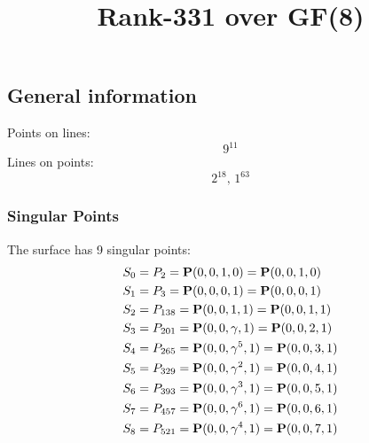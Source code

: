 \documentclass{article}
\newcommand\setTBstruts{\def\T{\rule{0pt}{2.6ex}}%
\def\B{\rule[-1.2ex]{0pt}{0pt}}}
\newcommand{\bP}{{\bf P}}
\begin{document}
 
\setTBstruts



{\allowdisplaybreaks%






\title{Rank-331 over GF(8)}
\author{}%
\maketitle%
%
{}



\subsection*{General information}
Points on lines:
$$
9^{11}$$
Lines on points:
$$
2^{18},\,1^{63}$$
\subsubsection*{Singular Points}
The surface has 9 singular points:\\
\begin{align*}
S_{0} &= P_{2}=\bP(0, 0, 1, 0) = \bP(0, 0, 1, 0)\\
S_{1} &= P_{3}=\bP(0, 0, 0, 1) = \bP(0, 0, 0, 1)\\
S_{2} &= P_{138}=\bP(0, 0, 1, 1) = \bP(0, 0, 1, 1)\\
S_{3} &= P_{201}=\bP(0, 0, \gamma , 1) = \bP(0, 0, 2, 1)\\
S_{4} &= P_{265}=\bP(0, 0, \gamma^{5}, 1) = \bP(0, 0, 3, 1)\\
S_{5} &= P_{329}=\bP(0, 0, \gamma^{2}, 1) = \bP(0, 0, 4, 1)\\
S_{6} &= P_{393}=\bP(0, 0, \gamma^{3}, 1) = \bP(0, 0, 5, 1)\\
S_{7} &= P_{457}=\bP(0, 0, \gamma^{6}, 1) = \bP(0, 0, 6, 1)\\
S_{8} &= P_{521}=\bP(0, 0, \gamma^{4}, 1) = \bP(0, 0, 7, 1)\\
\end{align*}
}
\end{document}
